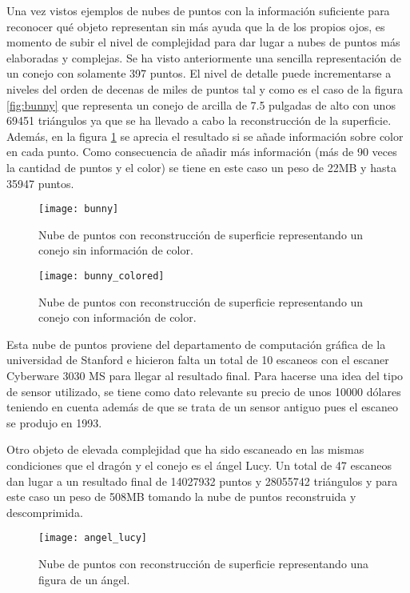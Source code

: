 Una vez vistos ejemplos de nubes de puntos con la información suficiente para reconocer qué objeto representan sin más ayuda que la de los propios ojos, es momento de subir el nivel de complejidad para dar lugar a nubes de puntos más elaboradas y complejas. Se ha visto anteriormente una sencilla representación de un conejo con solamente 397 puntos. El nivel de detalle puede incrementarse a niveles del orden de decenas de miles de puntos tal y como es el caso de la figura \ref{fig:bunny} que representa un conejo de arcilla\cite{pcl_conejo_stanford} de 7.5 pulgadas de alto con unos 69451 triángulos ya que se ha llevado a cabo la reconstrucción de la superficie. Además, en la figura \ref{fig:bunny_colored} se aprecia el resultado si se añade información sobre color en cada punto.
Como consecuencia de añadir más información (más de 90 veces la cantidad de puntos y el color) se tiene en este caso un peso de 22MB y hasta 35947 puntos.
\begin{figure}[!htb]
  \texttt{[image: bunny]}
  \caption{Nube de puntos con reconstrucción de superficie representando un conejo sin información de color.}\label{fig:bunny}
\endminipage\hfill
{}
  \texttt{[image: bunny\_colored]}
  \caption{Nube de puntos con reconstrucción de superficie representando un conejo con información de color.}\label{fig:bunny_colored}
\endminipage\hfill
\end{figure}
Esta nube de puntos proviene del departamento de computación gráfica de la universidad de Stanford e hicieron falta un total de 10 escaneos con el escaner Cyberware 3030 MS\cite{escaner_cyberware} para llegar al resultado final. Para hacerse una idea del tipo de sensor utilizado, se tiene como dato relevante su precio de unos 10000 dólares teniendo en cuenta además de que se trata de un sensor antiguo pues el escaneo se produjo en 1993.

Otro objeto de elevada complejidad que ha sido escaneado en las mismas condiciones que el dragón y el conejo es el ángel Lucy\cite{pcl_conejo_stanford}. Un total de 47 escaneos dan lugar a un resultado final de 14027932 puntos y 28055742 triángulos y para este caso un peso de 508MB tomando la nube de puntos reconstruida y descomprimida.

\begin{figure}
\centering
\texttt{[image: angel\_lucy]}
\caption{Nube de puntos con reconstrucción de superficie representando una figura de un ángel.}\label{fig:angel_lucy}
\end{figure}

